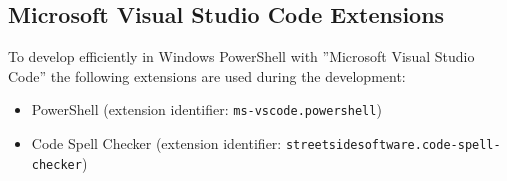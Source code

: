 \subsection{Microsoft Visual Studio Code Extensions}
To develop efficiently in Windows PowerShell with ''Microsoft Visual Studio Code'' the following extensions are used during the development:
\begin{itemize}
    \item PowerShell (extension identifier: \lstinline|ms-vscode.powershell|)
    \item Code Spell Checker (extension identifier: \lstinline|streetsidesoftware.code-spell-checker|)
\end{itemize}